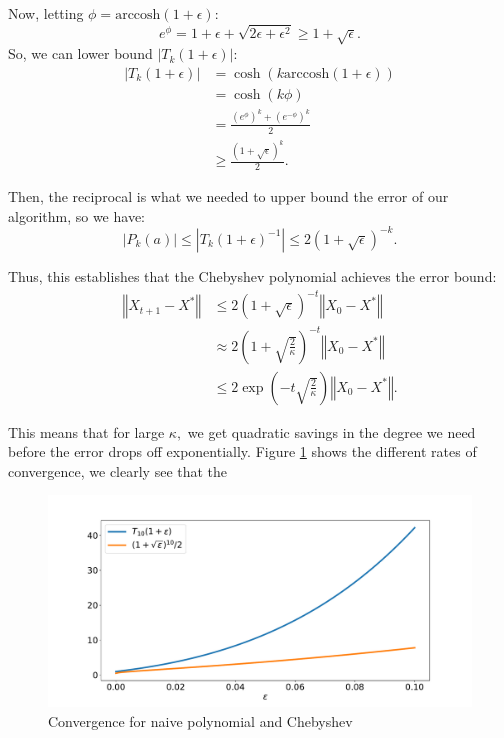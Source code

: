 Now, letting $\phi = \mathrm{arccosh}(1 + \epsilon)$:
\begin{equation*}
e^{\phi} = 1 + \epsilon + \sqrt{2\epsilon + \epsilon^2} \geq 1 + \sqrt{\epsilon}.
\end{equation*}
So, we can lower bound $|T_k(1 + \epsilon)|$:
\begin{align*}
|T_k(1 + \epsilon)| &= \cosh\left(k \mathrm{arccosh}(1 + \epsilon)\right) \\
&= \cosh(k\phi) \\
&= \frac{(e^\phi)^k + (e^{-\phi})^k}{2} \\
&\geq \frac{(1 + \sqrt{\epsilon})^k}{2}.
\end{align*}

Then, the reciprocal is what we needed to upper bound the error of our algorithm, so we have:
\begin{equation*}
|P_k(a)| \leq {|T_k(1 + \epsilon)^{-1}|} \leq 2(1 + \sqrt{\epsilon})^{-k}.
\end{equation*}

Thus, this establishes that the Chebyshev polynomial achieves the error bound:
\begin{align*}
\left\Vert X_{t+1} - X^* \right\Vert &\leq 2(1 + \sqrt{\epsilon})^{-t} \left\Vert X_0 -X^*\right\Vert \\
&\approx 2(1 + \sqrt{\frac{2}{\kappa}})^{-t} \left\Vert X_0 -X^*\right\Vert \\
&\leq 2\exp\left(-t \sqrt{\frac{2}{\kappa}}\right) \left\Vert X_0 -X^*\right\Vert.
\end{align*}

This means that for large $\kappa,$ we get quadratic savings in the degree we need before the error drops off exponentially. Figure \ref{convergence} shows the different rates of convergence, we clearly see that the 

\begin{figure}[ht]
\includegraphics[width=15cm]{figures/lecture6-conv.pdf}
\centering
\caption{Convergence for naive polynomial and Chebyshev}
\label{convergence}
\end{figure}

